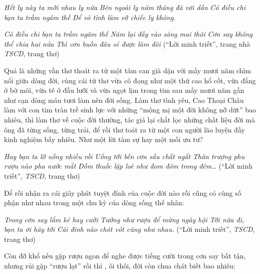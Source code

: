 \documentclass[../main.tex]{subfiles}
\begin{document}
\begin{multicols}{2}
\begin{blockquote}
\textit{Hết ly này ta mời nhau ly nữa}        
\textit{Bên ngoài ly năm tháng đã vơi dần}        
\textit{Có điều chi bạn ta trầm ngâm thế} 
\textit{Để vô tình làm vỡ chiếc ly không.} 
        
\textit{Có điều chi bạn ta trầm ngâm thế}        
\textit{Năm lại đầy vào sáng mai thôi}        
\textit{Cơn say không thể chia hai nửa}        
\textit{Thì cơn buồn đâu sẻ được làm đôi}        
(“Lời minh triết”, trang nhà \textit{TSCD}, trang thơ) 

\end{blockquote}
 
Quả là những vần thơ thoát ra từ một tâm can già dặn với mấy mươi năm chìm nổi giữa dòng đời, cùng cái tứ thơ vừa cô đọng như một thứ cao hổ cốt, vừa đắng ở bờ môi, vừa tê ở đầu lưỡi và vừa ngọt lịm trong tim sau mấy mươi năm gần như cạn dòng máu tươi làm nên đời sống. Làm thơ tình yêu, Cao Thoại Châu làm với con tim tràn trề sinh lực với những “mộng mị một đời không nỡ dứt” bao nhiêu, thì làm thơ về cuộc đời thường, tác giả lại chắt lọc những chất liệu đời mà ông đã từng sống, từng trải, để rồi thơ toát ra từ một con người lão luyện đầy kinh nghiệm bấy nhiêu. Như một lời tâm sự hay một mối ưu tư? 
\begin{blockquote}
        
\textit{Hay bạn ta lỡ uống nhiều rồi}        
\textit{Uống tới bến cơn sầu chất ngất}        
\textit{Thân trượng phu rượu nào pha nước mắt}        
\textit{Đốm thuốc lập loè như đom đóm trong đêm…}        
(“Lời minh triết”, \textit{TSCD}, trang thơ) 

\end{blockquote}
 
Để rồi nhận ra cái giây phút tuyệt đỉnh của cuộc đời nào rồi cũng có cùng số phận như nhau trong một chu kỳ của dòng sống thế nhân: 
\begin{blockquote}
        
\textit{Trong cơn say lắm kẻ hay cười}        
\textit{Tưởng như rượu để mừng ngày hội}        
\textit{Tới nữa đi, bạn ta ơi hãy tới}        
\textit{Cái đĩnh nào chót vót cũng như nhau.}        
(“Lời minh triết”, \textit{TSCD}, trang thơ) 

\end{blockquote}
 
Còn đỡ khổ nếu gặp rượu ngon để nghe được tiếng cười trong cơn say bất tận, nhưng rủi gặp “rượu lạt” rồi thì , ôi thôi, đời còn chua chát biết bao nhiêu: 
\begin{blockquote}
        

\end{blockquote}
\end{multicols}
\end{document}
